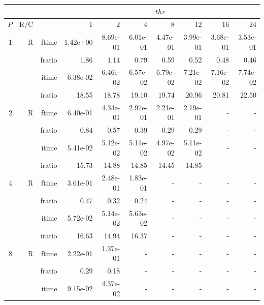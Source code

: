 \documentclass[a4paper]{article}
\begin{document}
\begin{table}[htbp]
\begin{center}
\begin{small}
\begin{tabular}{|r|r|r|r|r|r|r|r|r|r|}
\hline 
     & & & \multicolumn{7}{c|}{$thr$} \\ \hline
    $P$ & R/C &  & 1           & 2    & 4    & 8    & 12   & 16    & 24  \\ \hline\hline
     1 & R & ftime & 1.42e+00 & 8.69e-01 & 6.01e-01 & 4.47e-01 & 3.99e-01 & 3.68e-01 & 3.53e-01 \\   
          &      & fratio & 1.86 & 1.14 & 0.79 & 0.59 & 0.52 & 0.48 & 0.46 \\   
          &      & itime & 6.38e-02 & 6.46e-02 & 6.57e-02 & 6.79e-02 & 7.21e-02 & 7.16e-02 & 7.74e-02 \\   
          &      & iratio & 18.55 & 18.78 & 19.10 & 19.74 & 20.96 & 20.81 & 22.50 \\ \hline 
     2 & R & ftime & 6.40e-01 & 4.34e-01 & 2.97e-01 & 2.21e-01 & 2.19e-01 &     -     &     -     \\   
          &      & fratio & 0.84 & 0.57 & 0.39 & 0.29 & 0.29 &     -     &     -     \\   
          &      & itime & 5.41e-02 & 5.12e-02 & 5.11e-02 & 4.97e-02 & 5.11e-02 &     -     &     -     \\   
          &      & iratio & 15.73 & 14.88 & 14.85 & 14.45 & 14.85 &     -     &     -     \\ \hline 
     4 & R & ftime & 3.61e-01 & 2.48e-01 & 1.83e-01 &     -     &     -     &     -     &     -     \\   
          &      & fratio & 0.47 & 0.32 & 0.24 &     -     &     -     &     -     &     -     \\   
          &      & itime & 5.72e-02 & 5.14e-02 & 5.63e-02 &     -     &     -     &     -     &     -     \\   
          &      & iratio & 16.63 & 14.94 & 16.37 &     -     &     -     &     -     &     -     \\ \hline 
     8 & R & ftime & 2.22e-01 & 1.37e-01 &     -     &     -     &     -     &     -     &     -     \\   
          &      & fratio & 0.29 & 0.18 &     -     &     -     &     -     &     -     &     -     \\   
          &      & itime & 9.15e-02 & 4.37e-02 &     -     &     -     &     -     &     -     &     -     \\   

\end{tabular}
\end{small}
\end{center}
\end{table}
\end{document}
